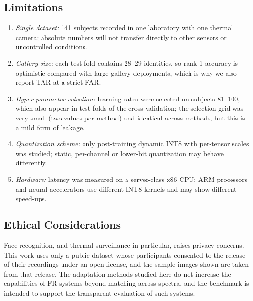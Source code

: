 \documentclass[journal]{IEEEtran}
\begin{document}
\subsection{Limitations}
\begin{enumerate}
  \item \emph{Single dataset:} 141 subjects recorded in one laboratory with one thermal camera; absolute numbers will not transfer directly to other sensors or uncontrolled conditions.
  \item \emph{Gallery size:} each test fold contains 28--29 identities, so rank-1 accuracy is optimistic compared with large-gallery deployments, which is why we also report TAR at a strict FAR.
  \item \emph{Hyper-parameter selection:} learning rates were selected on subjects 81--100, which also appear in test folds of the cross-validation; the selection grid was very small (two values per method) and identical across methods, but this is a mild form of leakage.
  \item \emph{Quantization scheme:} only post-training dynamic INT8 with per-tensor scales was studied; static, per-channel or lower-bit quantization may behave differently.
  \item \emph{Hardware:} latency was measured on a server-class x86 CPU; ARM processors and neural accelerators use different INT8 kernels and may show different speed-ups.
\end{enumerate}

\subsection{Ethical Considerations}
Face recognition, and thermal surveillance in particular, raises privacy concerns. This work uses only a public dataset whose participants consented to the release of their recordings under an open license, and the sample images shown are taken from that release. The adaptation methods studied here do not increase the capabilities of FR systems beyond matching across spectra, and the benchmark is intended to support the transparent evaluation of such systems.

\end{document}
